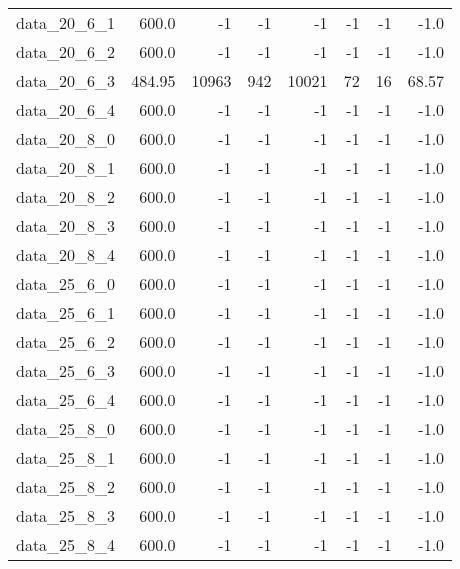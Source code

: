 \begin{tabular}{rrrrrrrr}
  data\_20\_6\_1 & 600.0 & -1 & -1 & -1 & -1 & -1 & -1.0 \\
  data\_20\_6\_2 & 600.0 & -1 & -1 & -1 & -1 & -1 & -1.0 \\
  data\_20\_6\_3 & 484.95 & 10963 & 942 & 10021 & 72 & 16 & 68.57 \\
  data\_20\_6\_4 & 600.0 & -1 & -1 & -1 & -1 & -1 & -1.0 \\
  data\_20\_8\_0 & 600.0 & -1 & -1 & -1 & -1 & -1 & -1.0 \\
  data\_20\_8\_1 & 600.0 & -1 & -1 & -1 & -1 & -1 & -1.0 \\
  data\_20\_8\_2 & 600.0 & -1 & -1 & -1 & -1 & -1 & -1.0 \\
  data\_20\_8\_3 & 600.0 & -1 & -1 & -1 & -1 & -1 & -1.0 \\
  data\_20\_8\_4 & 600.0 & -1 & -1 & -1 & -1 & -1 & -1.0 \\
  data\_25\_6\_0 & 600.0 & -1 & -1 & -1 & -1 & -1 & -1.0 \\
  data\_25\_6\_1 & 600.0 & -1 & -1 & -1 & -1 & -1 & -1.0 \\
  data\_25\_6\_2 & 600.0 & -1 & -1 & -1 & -1 & -1 & -1.0 \\
  data\_25\_6\_3 & 600.0 & -1 & -1 & -1 & -1 & -1 & -1.0 \\
  data\_25\_6\_4 & 600.0 & -1 & -1 & -1 & -1 & -1 & -1.0 \\
  data\_25\_8\_0 & 600.0 & -1 & -1 & -1 & -1 & -1 & -1.0 \\
  data\_25\_8\_1 & 600.0 & -1 & -1 & -1 & -1 & -1 & -1.0 \\
  data\_25\_8\_2 & 600.0 & -1 & -1 & -1 & -1 & -1 & -1.0 \\
  data\_25\_8\_3 & 600.0 & -1 & -1 & -1 & -1 & -1 & -1.0 \\
  data\_25\_8\_4 & 600.0 & -1 & -1 & -1 & -1 & -1 & -1.0 \\
  \hline
\end{tabular}
